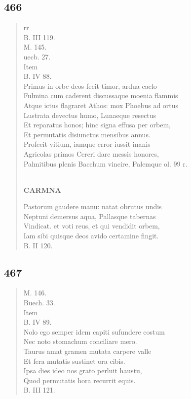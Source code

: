 \documentclass[11pt, a4paper]{report}
\begin{document}
            \subsection*{466}
      \begin{verse}
      rr \\ B. III 119. \\ M. 145. \\ uecb. 27. \\ Item \\ B. IV 88. \\ Primus in orbe deos fecit timor, ardua caelo \\ Fulmina cum caderent discussaque moenia flammis \\ Atque ictus flagraret Athos: mox Phoebus ad ortus \\ Lustrata devectus humo, Lunaeque resectus \\ Et reparatus honos; hinc signa effusa per orbem, \\ Et permutatis disiunctus mensibus annus. \\ Profecit vitium, iamque error iussit inanis \\ Agricolas primos Cereri dare messis honores, \\ Palmitibus plenis Bacchum vincire, Palemque ol. 99 r. \\ 
        ﻿\pagebreak 
     \marginpar{[344]} \begin{center} \textbf{CARMNA} \end{center}Pastorum gaudere manu: natat obrutus undis \\ Neptuni demersus aqua, Pallasque tabernas \\ Vindicat. et voti reus, et qui vendidit orbem, \\ Iam sibi quisque deos avido certamine fingit. \\ B. II 120. \\ 
      \end{verse}
  
            \subsection*{467}
      \begin{verse}
      M. 146. \\ Buech. 33. \\ Item \\ B. IV 89. \\ Nolo ego semper idem capiti sufundere costum \\ Nec noto stomachum conciliare mero. \\ Taurus amat gramen mutata carpere valle \\ Et fera mutatis sustinet ora cibis. \\ Ipsa dies ideo nos grato perluit haustu, \\ Quod permutatis hora recurrit equis. \\ B. III 121. \\ 
      \end{verse}
  
\end{document}

